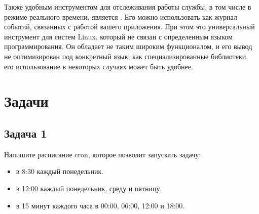 \documentclass[letterpaper,10pt,russian]{sphinxmanual}
\begin{document}
\sphinxAtStartPar
Также удобным инструментом для отслеживания работы службы, в том числе в режиме реального времени, является . Его можно использовать как журнал событий, связанных с работой вашего приложения. При этом это универсальный инструмент для систем Linux, который не связан с определенным языком программирования. Он обладает не таким широким функционалом, и его вывод не оптимизирован под конкретный язык, как специализированные библиотеки, его использование в некоторых случаях может быть удобнее.

\sphinxAtStartPar
{}

\sphinxstepscope


\section{Задачи}
\label{\detokenize{educational_materials/managers/exercises:id1}}\label{\detokenize{educational_materials/managers/exercises::doc}}

\subsection{Задача 1}
\label{\detokenize{educational_materials/managers/exercises:id2}}
\sphinxAtStartPar
Напишите расписание cron, которое позволит запускать задачу:
\begin{itemize}
\item {} 
\sphinxAtStartPar
в 8:30 каждый понедельник.

\item {} 
\sphinxAtStartPar
в 12:00 каждый понедельник, среду и пятницу.

\item {} 
\sphinxAtStartPar
в 15 минут каждого часа в 00:00, 06:00, 12:00 и 18:00.

\end{itemize}

\sphinxAtStartPar
{}
\end{document}

